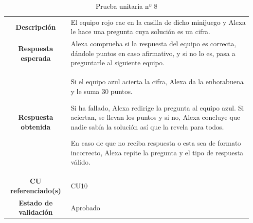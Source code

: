 \begin{table}[H]
	\centering
	\begin{tabular}{|c|p{9.3cm}|}
		\hline
		\rowcolor{lightgray}
		\multicolumn{2}{|c|}{\textbf{PU08}: Minijuego adivina la cifra} \\
		\hline
		\textbf{Descripción} & El equipo rojo cae en la casilla de dicho minijuego y Alexa le hace una pregunta cuya solución es un cifra.
		\vspace{0.2cm} \\
		\hline
		\textbf{Respuesta esperada} & Alexa comprueba si la respuesta del equipo es correcta, dándole puntos en caso afirmativo, y si no lo es, pasa a preguntarle al siguiente equipo. \vspace{0.2cm} \\
		\hline
		\textbf{Respuesta obtenida} & Si el equipo azul acierta la cifra, Alexa da la enhorabuena y le suma 30 puntos.
		
		Si ha fallado, Alexa redirige la pregunta al equipo azul. Si aciertan, se llevan los puntos y si no, Alexa concluye que nadie sabía la solución así que la revela para todos.
		
		En caso de que no reciba respuesta o esta sea de formato incorrecto, Alexa repite la pregunta y el tipo de respuesta válido. \\
		\hline
		\textbf{CU referenciado(s)} & CU10 \vspace{0.2cm} \\
		\hline
		\textbf{Estado de validación} & Aprobado \vspace{0.2cm} \\
		\hline
	\end{tabular}
	\caption{Prueba unitaria nº 8}
	\label{tab:PU08}
\end{table}

